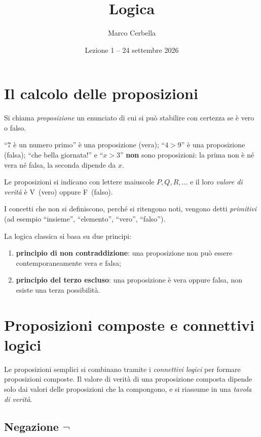 \documentclass[11pt,a4paper]{article}
\title{Logica}
\author{Marco Cerbella}
\date{Lezione 1 -- 24 settembre 2026}
\newcommand{\V}{\textsf{V}}
\newcommand{\F}{\textsf{F}}
\begin{document}
\maketitle

\section{Il calcolo delle proposizioni}

\begin{definizione}
Si chiama \emph{proposizione} un enunciato di cui si può stabilire con
certezza se è vero o falso.
\end{definizione}

\begin{esempio}
``$7$ è un numero primo'' è una proposizione (vera);
``$4 > 9$'' è una proposizione (falsa);
``che bella giornata!'' e ``$x > 3$'' \textbf{non} sono proposizioni:
la prima non è né vera né falsa, la seconda dipende da $x$.
\end{esempio}

Le proposizioni si indicano con lettere maiuscole $P, Q, R, \dots$ e il loro
\emph{valore di verità} è \V\ (vero) oppure \F\ (falso).

I concetti che non si definiscono, perché si ritengono noti, vengono detti
\emph{primitivi} (ad esempio ``insieme'', ``elemento'', ``vero'', ``falso'').

La logica classica si basa su due principi:
\begin{enumerate}
    \item \textbf{principio di non contraddizione}: una proposizione non può
          essere contemporaneamente vera e falsa;
    \item \textbf{principio del terzo escluso}: una proposizione è vera
          oppure falsa, non esiste una terza possibilità.
\end{enumerate}

\section{Proposizioni composte e connettivi logici}

Le proposizioni semplici si combinano tramite i \emph{connettivi logici}
per formare proposizioni composte. Il valore di verità di una proposizione
composta dipende solo dai valori delle proposizioni che la compongono, e si
riassume in una \emph{tavola di verità}.

\subsection{Negazione $\neg$}
\end{document}
